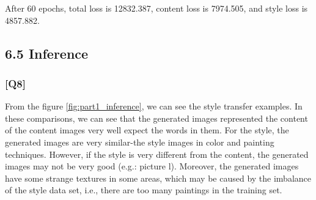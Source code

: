 \documentclass{article}
\begin{document}
After 60 epochs, total loss is 12832.387, content loss is 7974.505, and style loss is 4857.882.

\subsection*{6.5 Inference}

\subsubsection*{[Q8]}

From the figure \ref{fig:part1_inference}, we can see the style transfer examples.
In these comparisons, we can see that the generated images represented the content of the content images very well expect the words in them.
For the style, the generated images are very similar-the style images in color and painting techniques.
However, if the style is very different from the content, the generated images may not be very good (e.g.: picture l).
Moreover, the generated images have some strange textures in some areas, which may be caused by the imbalance of the style data set, i.e., there are too many paintings in the training set.
\end{document}
